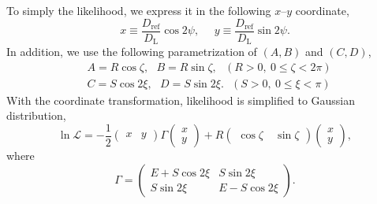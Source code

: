 \documentclass[12pt]{article}
\renewcommand{\L}{\mathcal{L}}
\newcommand{\Dref}{D_{\mathrm{ref}}}
\newcommand{\DL}{D_{\mathrm{L}}}
\begin{document}
To simply the likelihood, we express it in the following $x$--$y$ coordinate,
\begin{equation}
x \equiv \frac{\Dref}{\DL} \cos 2 \psi,~~~~~~y \equiv \frac{\Dref}{\DL} \sin 2 \psi.
\end{equation}
In addition, we use the following parametrization of $(A, B)$ and $(C, D)$,
\begin{align}
&A = R \cos \zeta,~~~B=R \sin \zeta,~~~(R>0,~0\leq\zeta<2\pi) \\
&C = S \cos 2 \xi,~~~D=S \sin 2 \xi.~~~(S>0,~0\leq\xi<\pi)
\end{align}
With the coordinate transformation, likelihood is simplified to Gaussian distribution,
\begin{equation}
\ln \L = - \frac{1}{2} \left(\begin{array}{cc} x & y\end{array}\right) \Gamma \left(\begin{array}{c} x \\ y\end{array}\right) + R \left(\begin{array}{cc} \cos \zeta \ & \sin \zeta \end{array}\right) \left(\begin{array}{c} x \\ y\end{array}\right),
\end{equation}
where
\begin{equation}
\Gamma = \left(\begin{array}{cc} E + S \cos 2 \xi & S \sin 2 \xi \\ S \sin 2 \xi & E - S \cos 2 \xi \end{array}\right).
\end{equation}
\end{document}
